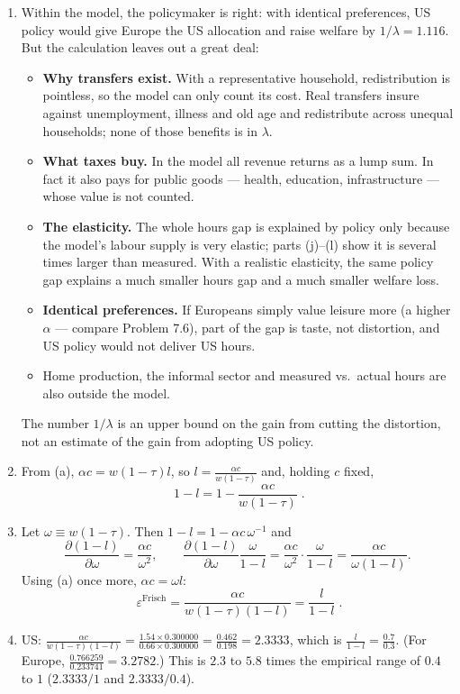 \documentclass[12pt, letterpaper]{article}
\newcommand{\pd}[2]{\dfrac{\partial #1}{\partial #2}}
\begin{document}
\begin{tcolorbox}[oddbox,title={Problem 7.5 \quad Prescott's Calculation}]
\begin{enumerate}
\item Within the model, the policymaker is right: with identical preferences, US policy would
give Europe the US allocation and raise welfare by $1/\lambda=1.116$. But the calculation
leaves out a great deal:
\begin{itemize}
\item \textbf{Why transfers exist.} With a representative household, redistribution is
pointless, so the model can only count its cost. Real transfers insure against unemployment,
illness and old age and redistribute across unequal households; none of those benefits is in
$\lambda$.
\item \textbf{What taxes buy.} In the model all revenue returns as a lump sum. In fact it also
pays for public goods --- health, education, infrastructure --- whose value is not counted.
\item \textbf{The elasticity.} The whole hours gap is explained by policy only because the
model's labour supply is very elastic; parts (j)--(l) show it is several times larger than
measured. With a realistic elasticity, the same policy gap explains a much smaller hours gap
and a much smaller welfare loss.
\item \textbf{Identical preferences.} If Europeans simply value leisure more (a higher
$\alpha$ --- compare Problem 7.6), part of the gap is taste, not distortion, and US policy
would not deliver US hours.
\item Home production, the informal sector and measured vs.\ actual hours are also outside
the model.
\end{itemize}
The number $1/\lambda$ is an upper bound on the gain from cutting the distortion, not an
estimate of the gain from adopting US policy.

\item From (a), $\alpha c=w(1-\tau)l$, so $l=\frac{\alpha c}{w(1-\tau)}$ and, holding $c$
fixed,
\[
\boxed{\;1-l=1-\frac{\alpha c}{w(1-\tau)}\;}.
\]

\item Let $\omega\equiv w(1-\tau)$. Then $1-l=1-\alpha c\,\omega^{-1}$ and
\[
\pd{(1-l)}{\omega}=\frac{\alpha c}{\omega^{2}},
\qquad
\pd{(1-l)}{\omega}\frac{\omega}{1-l}=\frac{\alpha c}{\omega^{2}}\cdot\frac{\omega}{1-l}
=\frac{\alpha c}{\omega(1-l)} .
\]
Using (a) once more, $\alpha c=\omega l$:
\[
\boxed{\;\varepsilon^{\text{Frisch}}=\frac{\alpha c}{w(1-\tau)(1-l)}=\frac{l}{1-l}\;}.
\]

\item US: $\frac{\alpha c}{w(1-\tau)(1-l)}=\frac{1.54\times0.300000}{0.66\times0.300000}
=\frac{0.462}{0.198}=\mathbf{2.3333}$, which is $\frac{l}{1-l}=\frac{0.7}{0.3}$. (For Europe,
$\frac{0.766259}{0.233741}=3.2782$.) This is $2.3$ to $5.8$ times the empirical range of
$0.4$ to $1$ ($2.3333/1$ and $2.3333/0.4$).


\end{enumerate}
\end{tcolorbox}
\end{document}
